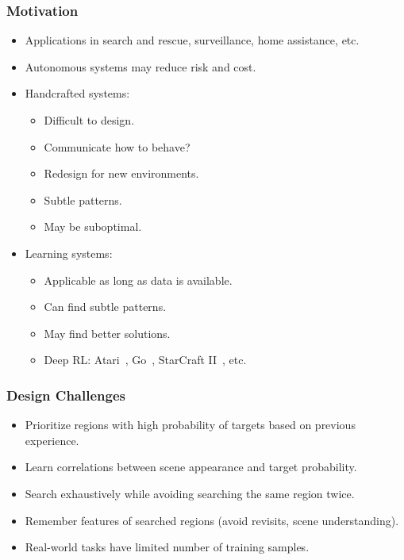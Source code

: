 \begin{frame}
    \frametitle{Motivation}
    
    \begin{itemize}
        \item Applications in search and rescue, surveillance, home assistance, etc.
        \item Autonomous systems may reduce risk and cost.
        \item Handcrafted systems:
        \begin{itemize}
            \item Difficult to design.
            \item Communicate how to behave?
            \item Redesign for new environments.
            \item Subtle patterns.
            \item May be suboptimal.
        \end{itemize}
        \item Learning systems:
        \begin{itemize}
            \item Applicable as long as data is available.
            \item Can find subtle patterns.
            \item May find better solutions.
            \item Deep RL: Atari~\cite{mnih_human-level_2015}, Go~\cite{silver_mastering_2016}, StarCraft II~\cite{vinyals_grandmaster_2019}, etc.
        \end{itemize}
    \end{itemize}
\end{frame}

\begin{frame}
    \frametitle{Design Challenges}

    \begin{itemize}
        \item Prioritize regions with high probability of targets based on previous experience.
        \item Learn correlations between scene appearance and target probability.
        \item Search exhaustively while avoiding searching the same region twice.
        \item Remember features of searched regions (avoid revisits, scene understanding).
        \item Real-world tasks have limited number of training samples.
    \end{itemize}
\end{frame}

